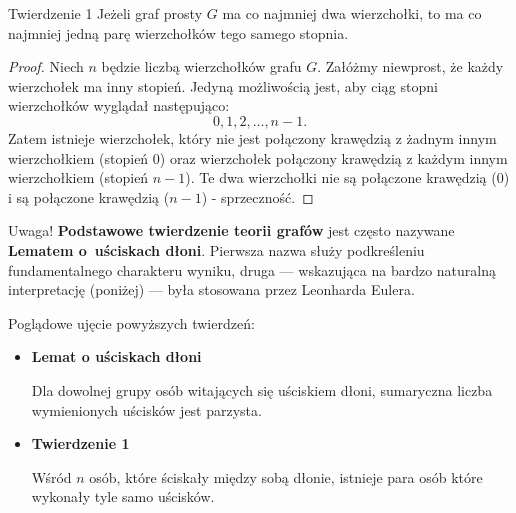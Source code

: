 \documentclass[a4paper,10pt]{beamer}
\begin{document}
\begin{frame}

	\begin{block}{Twierdzenie 1}
		Jeżeli graf prosty $G$ ma co najmniej dwa wierzchołki, to ma co najmniej jedną parę wierzchołków tego samego stopnia.
	\end{block}
	
	\begin{proof}
		Niech $n$ będzie liczbą wierzchołków grafu $G$. Załóżmy niewprost, że każdy wierzchołek ma inny stopień. Jedyną możliwością jest, aby ciąg stopni wierzchołków wyglądał następująco: $$0,1,2,\ldots,n-1.$$
		Zatem istnieje wierzchołek, który nie jest połączony krawędzią z żadnym innym wierzchołkiem (stopień $0$) oraz wierzchołek połączony krawędzią z każdym innym wierzchołkiem (stopień $n-1$). Te dwa wierzchołki nie są połączone krawędzią ($0$) i są połączone krawędzią ($n-1$) - sprzeczność.
	\end{proof}
\end{frame}


\begin{frame}

\begin{alertblock}{Uwaga!}
{\bf Podstawowe twierdzenie teorii grafów} jest często nazywane {\bf Lematem o~uściskach dłoni}. Pierwsza nazwa służy podkreśleniu fundamentalnego charakteru wyniku, druga --- wskazująca na bardzo naturalną interpretację (poniżej) --- była stosowana przez Leonharda Eulera.
\end{alertblock}

\bigskip

Poglądowe ujęcie powyższych twierdzeń: 

\begin{itemize}
\item {\bf Lemat o uściskach dłoni}

	Dla dowolnej grupy osób witających się uściskiem dłoni, sumaryczna liczba wymienionych uścisków jest parzysta.
\item {\bf Twierdzenie 1}

	Wśród $n$ osób, które ściskały między sobą dłonie, istnieje para osób które wykonały tyle samo uścisków.
\end{itemize}
\end{frame}
\end{document}
